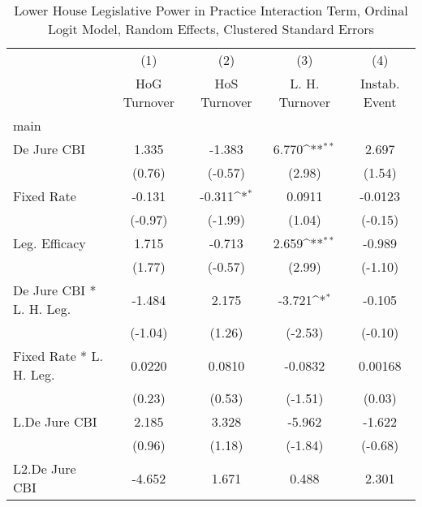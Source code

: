 {
\def\sym#1{\ifmmode^{#1}\else\(^{#1}\)\fi}
\begin{longtable}{l*{4}{c}}
\caption{Lower House Legislative Power in Practice Interaction Term, Ordinal Logit Model, Random Effects, Clustered Standard Errors \label{llpintlagordLogDJ}}\\
\hline\hline\endfirsthead\hline\endhead\hline\endfoot\endlastfoot
                &\multicolumn{1}{c}{(1)}&\multicolumn{1}{c}{(2)}&\multicolumn{1}{c}{(3)}&\multicolumn{1}{c}{(4)}\\
                &\multicolumn{1}{c}{HoG Turnover}&\multicolumn{1}{c}{HoS Turnover}&\multicolumn{1}{c}{L. H. Turnover}&\multicolumn{1}{c}{Instab. Event}\\
\hline
main            &                  &                  &                  &                  \\
De Jure CBI     &    1.335         &   -1.383         &    6.770\sym{**} &    2.697         \\
                &   (0.76)         &  (-0.57)         &   (2.98)         &   (1.54)         \\
[1em]
Fixed Rate      &   -0.131         &   -0.311\sym{*}  &   0.0911         &  -0.0123         \\
                &  (-0.97)         &  (-1.99)         &   (1.04)         &  (-0.15)         \\
[1em]
Leg. Efficacy   &    1.715         &   -0.713         &    2.659\sym{**} &   -0.989         \\
                &   (1.77)         &  (-0.57)         &   (2.99)         &  (-1.10)         \\
[1em]
De Jure CBI * L. H. Leg.&   -1.484         &    2.175         &   -3.721\sym{*}  &   -0.105         \\
                &  (-1.04)         &   (1.26)         &  (-2.53)         &  (-0.10)         \\
[1em]
Fixed Rate * L. H. Leg.&   0.0220         &   0.0810         &  -0.0832         &  0.00168         \\
                &   (0.23)         &   (0.53)         &  (-1.51)         &   (0.03)         \\
[1em]
L.De Jure CBI   &    2.185         &    3.328         &   -5.962         &   -1.622         \\
                &   (0.96)         &   (1.18)         &  (-1.84)         &  (-0.68)         \\
[1em]
L2.De Jure CBI  &   -4.652         &    1.671         &    0.488         &    2.301         \\

\end{longtable}}
